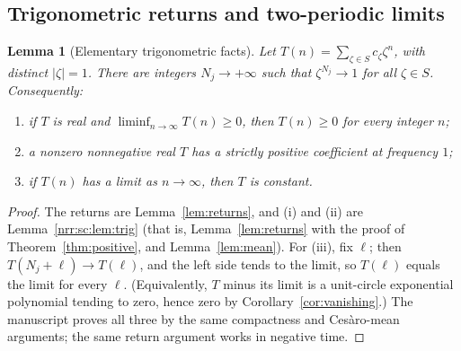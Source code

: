 \documentclass[11pt,letterpaper]{article}
\newtheorem{lemma}[theorem]{Lemma}
\theoremstyle{definition}
\theoremstyle{remark}
\begin{document}
\subsection{Trigonometric returns and two-periodic limits}

\begin{lemma}[Elementary trigonometric facts]
\label{nrr:dc:lem:trig}
Let $T(n)=\sum_{\zeta\in S}c_\zeta\zeta^n$, with distinct $|\zeta|=1$.
There are integers $N_j\to+\infty$ such that $\zeta^{N_j}\to1$ for all
$\zeta\in S$. Consequently:
\begin{enumerate}[label=(\roman*),itemsep=1pt]
\item if $T$ is real and $\liminf_{n\to\infty}T(n)\ge0$, then
$T(n)\ge0$ for every integer $n$;
\item a nonzero nonnegative real $T$ has a strictly positive coefficient
at frequency $1$;
\item if $T(n)$ has a limit as $n\to\infty$, then $T$ is constant.
\end{enumerate}
\end{lemma}
\begin{proof}
The returns are Lemma~\ref{lem:returns}, and (i) and (ii) are
Lemma~\ref{nrr:sc:lem:trig} (that is, Lemma~\ref{lem:returns} with the proof
of Theorem~\ref{thm:positive}, and Lemma~\ref{lem:mean}). For (iii), fix
$\ell$; then $T(N_j+\ell)\to T(\ell)$, and the left side tends to the limit,
so $T(\ell)$ equals the limit for every $\ell$. (Equivalently, $T$ minus its
limit is a unit-circle exponential polynomial tending to zero, hence zero by
Corollary~\ref{cor:vanishing}.) The manuscript proves all three by the same
compactness and Ces\`aro-mean arguments; the same return argument works in
negative time.
\end{proof}
\end{document}
